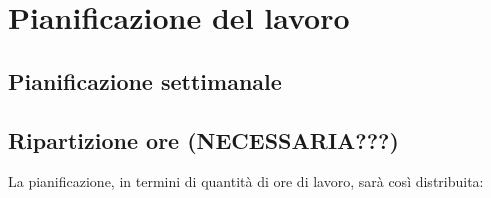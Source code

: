 
\section*{Pianificazione del lavoro}

\subsection*{Pianificazione settimanale}
\prospettoSettimanale

\newpage

\subsection*{Ripartizione ore (NECESSARIA???)}

La pianificazione, in termini di quantità di ore di lavoro, sarà così distribuita:

\begin{center}
    
\end{center}

\newpage
